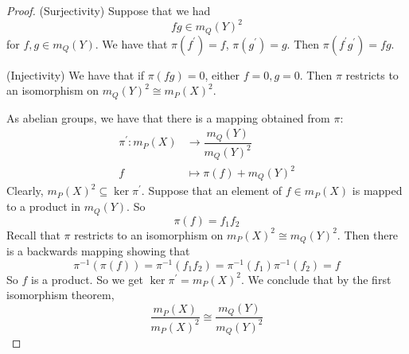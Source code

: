 \documentclass{article}
\begin{document}
\begin{itemize}
\begin{proof}
                (Surjectivity) Suppose that we had
                    \begin{equation*}
                        fg \in m_{ Q}(Y)^{2}
                    \end{equation*}
                for $f, g \in m_{ Q}(Y)$. We have that $\pi ( f^{\prime}) = f$, $\pi ( g^{\prime}) = g$. Then $ \pi ( f^{\prime}g^{\prime}) = fg$. 

                (Injectivity) We have that if $\pi ( fg) = 0$, either $f = 0, g = 0$. Then $\pi$ restricts to an isomorphism on $m_{Q}(Y)^{2} \cong m_{ P}(X)^{2}$.

                As abelian groups, we have that there is a mapping obtained from $\pi$:
                    \begin{align*}
                        \pi^{\prime} : m_{P}(X) &\rightarrow\dfrac{ m_{Q}(Y)}{m_{Q}(Y)^{2}} \\
                        f        &\mapsto \pi  ( f) + m_{ Q}(Y)^{2}
                    \end{align*}
                Clearly, $m_{P}(X)^{2} \subseteq \ker{ \pi^{\prime}}$. Suppose that an element of $f \in m_{P}(X)$ is mapped to a product in $m_{Q}(Y)$. So
                    \begin{equation*}
                        \pi ( f) = f_{1}f_{2}
                    \end{equation*}
                Recall that $\pi$ restricts to an isomorphism on $m_{P}(X)^{2} \cong m_{ Q}(Y)^{2}$. Then there is a backwards mapping showing that 
                    \begin{equation*}
                        \pi^{-1}(\pi ( f)) = \pi^{-1}(f_{1}f_{2}) = \pi^{-1}(f_{1})\pi^{-1}(f_{2}) = f
                    \end{equation*}
                So $f$ is a product. So we get $\ker{\pi^{\prime}} = m_{P}(X)^{2}$. We conclude that by the first isomorphism theorem, 
                    \begin{equation*}
                        \dfrac{m_{P}(X)}{m_{P}(X)^{2}} \cong\dfrac{ m_{Q}(Y)}{m_{Q}(Y)^{2}}
                    \end{equation*}


\end{proof}
\end{itemize}
\end{document}
